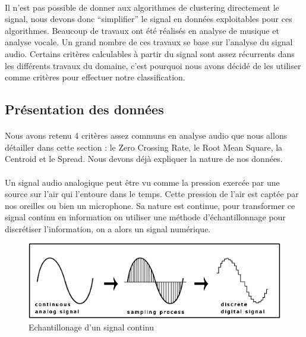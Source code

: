 \documentclass[soumission]{ir}
\begin{document}
\paragraph{}
Il n’est pas possible de donner aux algorithmes de clustering directement le signal, nous devons donc 
“simplifier” le signal en données exploitables pour ces algorithmes. Beaucoup de travaux ont été réalisés 
en analyse de musique et analyse vocale. Un grand nombre de ces travaux se base sur l’analyse du signal 
audio. Certains critères calculables à partir du signal sont assez récurrents dans les différents travaux 
du domaine, c’est pourquoi nous avons décidé de les utiliser comme critères pour effectuer notre 
classification.

\subsection{Présentation des données}
\paragraph{}
Nous avons retenu 4 critères assez communs en analyse audio que nous allons détailler dans cette section : 
le Zero Crossing Rate, le Root Mean Square, la Centroid et le Spread. Nous devons déjà expliquer la nature 
de nos données.

\paragraph{}
Un signal audio analogique peut être vu comme la pression exercée par une source sur l’air qui l’entoure 
dans le temps. Cette pression de l’air est captée par nos oreilles ou bien un microphone. Sa nature est 
continue, pour transformer ce signal continu en information on utiliser une méthode d'échantillonnage pour 
discrétiser l’information, on a alors un signal numérique.

\begin{figure}[ht]
    \centering
    \includegraphics[scale=0.7]{images/Sampling-of-audio-signal.png}
    \caption{Echantillonage d'un signal continu}
    \label{ex_echantillonage}
\end{figure}
\end{document}
